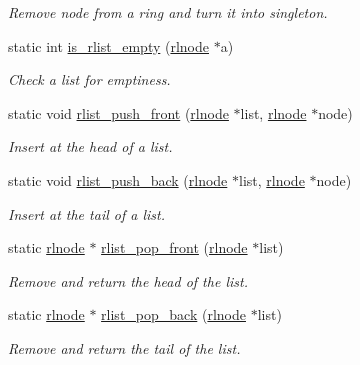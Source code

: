 \begin{DoxyCompactItemize}
\begin{DoxyCompactList}\small\item\em Remove node from a ring and turn it into singleton. \end{DoxyCompactList}\item 
static int \hyperlink{group__rlists_gaf60549214daf0df46bcd1a0d5ba5b661}{is\+\_\+rlist\+\_\+empty} (\hyperlink{group__rlists_ga8f6244877f7ce2322c90525217ea6e7a}{rlnode} $\ast$a)
\begin{DoxyCompactList}\small\item\em Check a list for emptiness. \end{DoxyCompactList}\item 
static void \hyperlink{group__rlists_ga63ab59e50f2007a6bfedb0180a73b06f}{rlist\+\_\+push\+\_\+front} (\hyperlink{group__rlists_ga8f6244877f7ce2322c90525217ea6e7a}{rlnode} $\ast$list, \hyperlink{group__rlists_ga8f6244877f7ce2322c90525217ea6e7a}{rlnode} $\ast$node)
\begin{DoxyCompactList}\small\item\em Insert at the head of a list. \end{DoxyCompactList}\item 
static void \hyperlink{group__rlists_gac454004e8fb74ccd539e7fbd1affa86a}{rlist\+\_\+push\+\_\+back} (\hyperlink{group__rlists_ga8f6244877f7ce2322c90525217ea6e7a}{rlnode} $\ast$list, \hyperlink{group__rlists_ga8f6244877f7ce2322c90525217ea6e7a}{rlnode} $\ast$node)
\begin{DoxyCompactList}\small\item\em Insert at the tail of a list. \end{DoxyCompactList}\item 
static \hyperlink{group__rlists_ga8f6244877f7ce2322c90525217ea6e7a}{rlnode} $\ast$ \hyperlink{group__rlists_ga5cc2be48f94a7573fb8952356c6ba7d1}{rlist\+\_\+pop\+\_\+front} (\hyperlink{group__rlists_ga8f6244877f7ce2322c90525217ea6e7a}{rlnode} $\ast$list)
\begin{DoxyCompactList}\small\item\em Remove and return the head of the list. \end{DoxyCompactList}\item 
static \hyperlink{group__rlists_ga8f6244877f7ce2322c90525217ea6e7a}{rlnode} $\ast$ \hyperlink{group__rlists_ga55f998d5871e6e563b4320392995a6c5}{rlist\+\_\+pop\+\_\+back} (\hyperlink{group__rlists_ga8f6244877f7ce2322c90525217ea6e7a}{rlnode} $\ast$list)
\begin{DoxyCompactList}\small\item\em Remove and return the tail of the list. \end{DoxyCompactList}\item 

\end{DoxyCompactItemize}
